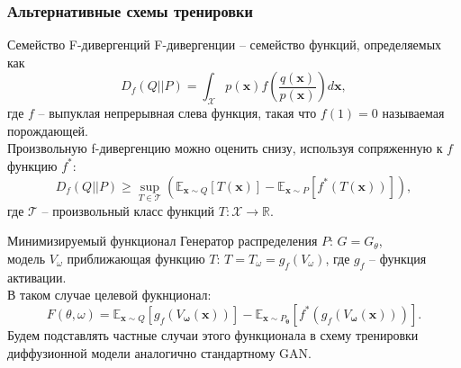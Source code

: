 \documentclass[8pt]{beamer}
\begin{document}
\begin{frame}
	\frametitle{Альтернативные схемы тренировки}
	\begin{block}{Семейство F-дивергенций}
		F-дивергенции -- семейство функций, определяемых как
		\begin{equation*}
				D_f(Q||P) = \int_\mathcal{X} p(\textbf{x}) f\left(\frac{q(\textbf{x})}{p(\textbf{x})}\right)d\textbf{x},
		\end{equation*}
		где $f$ -- выпуклая непрерывная слева функция, такая что $f(1) = 0$ называемая порождающей.\\
		Произвольную f-дивергенцию можно оценить снизу, используя сопряженную к $f$ функцию $f^*$:
		\begin{equation*}
			D_f(Q||P)\geqslant \sup\limits_{T \in \mathcal{T}}\left(\mathbb{E}_{\textbf{x}\sim Q} [T(\textbf{x})] - \mathbb{E}_{\textbf{x}\sim P} [f^*(T(\textbf{x}))] \right),
		\end{equation*}
		где $\mathcal{T}$ -- произвольный класс функций $T:\mathcal{X} \to \mathbb{R}$.
	\end{block}
	\begin{block}{Минимизируемый функционал}
		Генератор распределения $P$: $G = G_\theta$, \\
		модель $V_\omega$ приближающая функцию $T$: $T = T_\omega = g_f(V_\omega)$, где $g_f$ --  функция активации. \\
		В таком случае целевой фукнционал: 
		\begin{equation*}
			F(\theta, \omega) = \mathbb{E}_{\textbf{x}\sim Q} [g_f(V_\mathbf{\omega}(\textbf{x}))] - \mathbb{E}_{ \textbf{x}\sim P_\mathbf{\theta}}[f^*(g_f(V_\mathbf{\omega}(\textbf{x})))].
		\end{equation*}
		Будем подставлять частные случаи этого функционала в схему тренировки диффузионной модели аналогично стандартному GAN.
	\end{block}
\end{frame}
\end{document}
